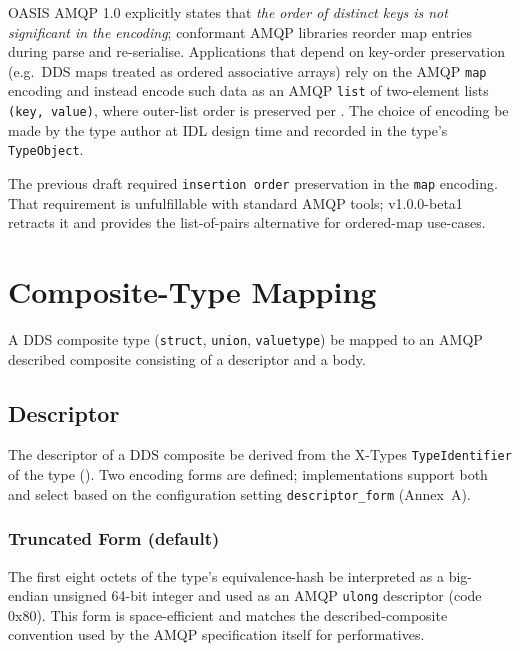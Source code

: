\documentclass{../styles/zerodds-vendor-spec}
\begin{document}
OASIS AMQP 1.0 
explicitly states that \emph{the order of distinct keys is not
significant in the encoding}; conformant AMQP libraries
 reorder map entries during parse and re-serialise.
Applications that depend on key-order preservation (e.g.\ DDS
maps treated as ordered associative arrays)  rely
on the AMQP \texttt{map} encoding and  instead
encode such data as an AMQP \texttt{list} of two-element lists
\texttt{(key, value)}, where outer-list order is preserved per
. The choice of encoding
 be made by the type author at IDL design time and
recorded in the type's \texttt{TypeObject}.

\begin{specnote}
The previous draft required \texttt{insertion order} preservation
in the \texttt{map} encoding. That requirement is unfulfillable
with standard AMQP tools; v1.0.0-beta1 retracts it and provides
the list-of-pairs alternative for ordered-map use-cases.
\end{specnote}

\section{Composite-Type Mapping}\label{sec:pim-composite-mapping}

A DDS composite type (\texttt{struct}, \texttt{union}, \texttt{valuetype})
 be mapped to an AMQP described composite consisting of
a descriptor and a body.

\subsection{Descriptor}

The descriptor of a DDS composite  be derived from
the X-Types \texttt{TypeIdentifier} of the type
(). Two encoding forms are
defined; implementations  support both and select
based on the configuration setting
\texttt{descriptor\_form} (Annex~A).

\subsubsection{Truncated Form (default)}

The first eight octets of the type's equivalence-hash
 be interpreted as a big-endian unsigned 64-bit
integer and used as an AMQP \texttt{ulong} descriptor (code
\textsf{0x80}). This form is space-efficient and matches the
described-composite convention used by the AMQP specification
itself for performatives.
\end{document}
